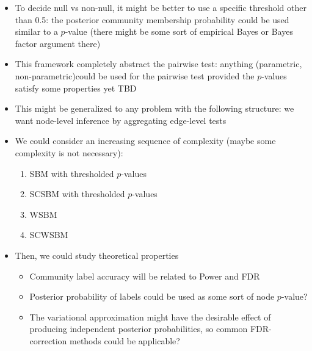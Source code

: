 \documentclass[english]{article}
\begin{document}
\begin{itemize}
    \item To decide null vs non-null, it might be better to use a specific threshold 
    other than 0.5: the posterior community membership probability could be used 
    similar to a $p$-value (there might 
    be some sort of empirical Bayes or Bayes factor argument there)
    \item This framework completely abstract the pairwise test: anything  
    (parametric, non-parametric)could be used for the pairwise test
    provided the $p$-values satisfy some properties yet TBD
    \item This might be generalized to any problem with the following structure: we want node-level inference by aggregating edge-level tests
    \item We could consider an increasing sequence of complexity (maybe some complexity is not necessary):
    \begin{enumerate}
        \item SBM with thresholded $p$-values
        \item SCSBM with thresholded $p$-values
        \item WSBM 
        \item SCWSBM
    \end{enumerate}
    \item Then, we could study theoretical properties
    \begin{itemize}
        \item Community label accuracy will be related to Power and FDR
        \item Posterior probability of labels could be used as some sort of node $p$-value?
        \item The variational approximation might have the desirable effect of
        producing independent posterior probabilities, so common FDR-correction 
        methods could be applicable?
    \end{itemize}
\end{itemize}
\end{document}
